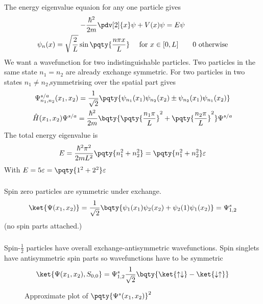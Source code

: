 \documentclass[12pt]{article}
\begin{document}
\subsection{} The energy eigenvalue equaion for any one particle gives\begin{gather*}
- \frac{\hbar^2}{2m} \pdv[2]{x} \psi + V(x)\psi = E \psi\\
\psi_n(x) = \sqrt{\frac{2}{L}}\sin \pqty{\frac{n\pi x}{L}} \quad\text{ for }x\in[0,L] \qquad 0 \text{ otherwise}
\end{gather*}
We want a wavefunction for two indistinguishable particles. Two particles in the same state $n_1=n_2$ are already exchange symmetric. For two particles in two states \(n_1 \neq n_2\),symmetrising over the spatial part gives\begin{gather*}
\Psi^{s/a}_{n_1,n_2}(x_1,x_2) = \frac{1}{\sqrt{2}}\pqty{\psi_{n_1}(x_1)\psi_{n_2}(x_2) \pm \psi_{n_2}(x_1)\psi_{n_1}(x_2)}\\
\hat{H}(x_1,x_2) \Psi^{s/a} = \frac{\hbar^2}{2m} \bqty{\pqty{\frac{n_1\pi}{L}}^2 +\pqty{\frac{n_2\pi}{L}}^2}\Psi^{s /a}
\end{gather*}
The total energy eigenvalue is \[
E =\frac{\hbar^2\pi^2}{2mL^2}\pqty{n_1^2 + n_2^2} = \pqty{n_1^2 + n_2^2} \varepsilon
\]
With \(E = 5 \varepsilon = \pqty{1^2 + 2^2}\varepsilon\)
\subsubsection{} Spin zero particles are symmetric under exchange. 
\[
\ket{\Psi(x_1,x_2)} = \frac{1}{\sqrt{2}}\bqty{\psi_{1}(x_1)\psi_{2}(x_2) + \psi_{2}(1)\psi_{1}(x_2)} = \Psi^s_{1,2}
\]
(no spin parts attached.)
\subsubsection{} Spin-\(\frac{1}{2}\) particles have overall exchange-antisymmetric wavefunctions. Spin singlets have antisymmetric spin parts so wavefunctions have to be symmetric
\[
\ket{\Psi(x_1,x_2), S_{0,0}} = \Psi^s_{1,2} \frac{1}{\sqrt{2}} \bqty{\ket{\uparrow\downarrow} - \ket{\downarrow\uparrow} }
\]
\begin{figure}[H]
\centering
\def\svgwidth{200pt}
\caption{Approximate plot of  \(\pqty{\Psi^s(x_1,x_2)}^2\)}
\end{figure}
\end{document}
